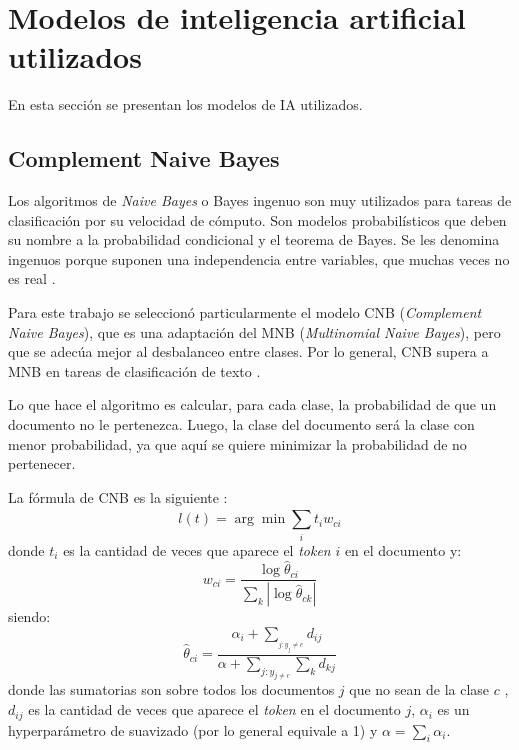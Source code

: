 \section{Modelos de inteligencia artificial utilizados}

En esta sección se presentan los modelos de IA utilizados.

\subsection{Complement Naive Bayes}

Los algoritmos de \textit{Naive Bayes} o Bayes ingenuo son muy utilizados para tareas de clasificación por su velocidad de cómputo. Son modelos probabilísticos que deben su nombre a la probabilidad condicional y el teorema de Bayes. Se les denomina ingenuos porque suponen una independencia entre variables, que muchas veces no es real \citep{WEBSITE:18}.

Para este trabajo se seleccionó particularmente el modelo CNB (\textit{Complement Naive Bayes}), que es una adaptación del MNB (\textit{Multinomial Naive Bayes}), pero que se adecúa mejor al desbalanceo entre clases. Por lo general, CNB supera a MNB en tareas de clasificación de texto \citep{ARTICLE:6}.

Lo que hace el algoritmo es calcular, para cada clase, la probabilidad de que un documento no le pertenezca. Luego, la clase del documento será la clase con menor probabilidad, ya que aquí se quiere minimizar la probabilidad de no pertenecer.

La fórmula de CNB es la siguiente \citep{WEBSITE:19}:
\begin{equation}
l(t) = \arg \min \sum_{i}^{}t_{i}w_{ci}
\end{equation}
donde $t_{i}$ es la cantidad de veces que aparece el \textit{token} $i$ en el documento y:
\begin{equation}
w_{ci} = \frac{\log{\widehat{\theta}_{ci}}}{\sum_{k}^{}|\log{\widehat{\theta}_{ck}}|}
\end{equation}
siendo:
\begin{equation}
\label{eq:tita}
\widehat{\theta}_{ci} = \frac{\alpha_{i} + \sum_{_{j:y_{j}\neq c}}^{}d_{ij}}{\alpha+\sum_{j:y_{j\neq c}}^{}\sum_{k}^{}d_{kj}}
\end{equation}
donde las sumatorias son sobre todos los documentos $j$ que no sean de la clase $c$ , $d_{ij}$ es la cantidad de veces que aparece el \textit{token} en el documento $j$, $\alpha_{i}$ es un hyperparámetro de suavizado (por lo general equivale a 1) y $\alpha = \sum_{i}^{}\alpha_{i}$.
